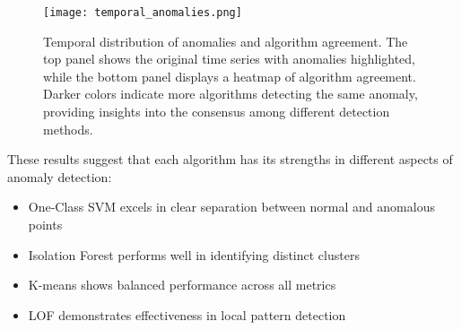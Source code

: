 \documentclass[conference]{IEEEtran}
\begin{document}
\begin{figure}[!ht]
\centering
\texttt{[image: temporal\_anomalies.png]}
\caption{Temporal distribution of anomalies and algorithm agreement. The top panel shows the original time series with anomalies highlighted, while the bottom panel displays a heatmap of algorithm agreement. Darker colors indicate more algorithms detecting the same anomaly, providing insights into the consensus among different detection methods.}
\label{fig:temporal_anomalies}
\end{figure}

These results suggest that each algorithm has its strengths in different aspects of anomaly detection:
\begin{itemize}
    \item One-Class SVM excels in clear separation between normal and anomalous points
    \item Isolation Forest performs well in identifying distinct clusters
    \item K-means shows balanced performance across all metrics
    \item LOF demonstrates effectiveness in local pattern detection
\end{itemize}
\end{document}
